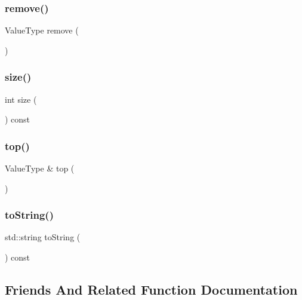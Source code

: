 \mbox{\label{classStack_a025ec97fa5b04552f5ad0902c1f02ac1}} 
\subsubsection{\texorpdfstring{remove()}{remove()}}
{\footnotesize\ttfamily Value\+Type remove (\begin{DoxyParamCaption}{ }\end{DoxyParamCaption})}

\mbox{\label{classStack_af9593d4a5ff4274efaf429cb4f9e57cc}} 
\subsubsection{\texorpdfstring{size()}{size()}}
{\footnotesize\ttfamily int size (\begin{DoxyParamCaption}{ }\end{DoxyParamCaption}) const}

\mbox{\label{classStack_af4e7b293e5989a3737c116dbf8f4eaf2}} 
\subsubsection{\texorpdfstring{top()}{top()}}
{\footnotesize\ttfamily Value\+Type \& top (\begin{DoxyParamCaption}{ }\end{DoxyParamCaption})}

\mbox{\label{classStack_a1fe5121d6528fdea3f243321b3fa3a49}} 
\subsubsection{\texorpdfstring{to\+String()}{toString()}}
{\footnotesize\ttfamily std\+::string to\+String (\begin{DoxyParamCaption}{ }\end{DoxyParamCaption}) const}



\subsection{Friends And Related Function Documentation}
\mbox{\label{classStack_add24e0ce849c0b2045c24ee3fba490ea}} 

